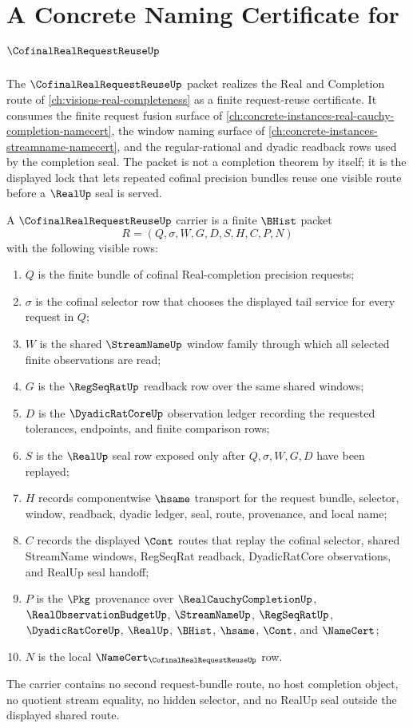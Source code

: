 \chapter{A Concrete Naming Certificate for $\CofinalRealRequestReuseUp$}
\label{ch:concrete-instances-cofinalrealrequestreuse-namecert}

The $\CofinalRealRequestReuseUp$ packet realizes the Real and Completion route of \autoref{ch:visions-real-completeness} as a finite request-reuse certificate. It consumes the finite request fusion surface of \autoref{ch:concrete-instances-real-cauchy-completion-namecert}, the window naming surface of \autoref{ch:concrete-instances-streamname-namecert}, and the regular-rational and dyadic readback rows used by the completion seal. The packet is not a completion theorem by itself; it is the displayed lock that lets repeated cofinal precision bundles reuse one visible route before a $\RealUp$ seal is served.

\begin{definition}
\label{def:cofinal-real-request-reuse-carrier}
A $\CofinalRealRequestReuseUp$ carrier is a finite $\BHist$ packet
$$
R=(Q,\sigma,W,G,D,S,H,C,P,N)
$$
with the following visible rows:
\begin{enumerate}
\item $Q$ is the finite bundle of cofinal Real-completion precision requests;
\item $\sigma$ is the cofinal selector row that chooses the displayed tail service for every request in $Q$;
\item $W$ is the shared $\StreamNameUp$ window family through which all selected finite observations are read;
\item $G$ is the $\RegSeqRatUp$ readback row over the same shared windows;
\item $D$ is the $\DyadicRatCoreUp$ observation ledger recording the requested tolerances, endpoints, and finite comparison rows;
\item $S$ is the $\RealUp$ seal row exposed only after $Q,\sigma,W,G,D$ have been replayed;
\item $H$ records componentwise $\hsame$ transport for the request bundle, selector, window, readback, dyadic ledger, seal, route, provenance, and local name;
\item $C$ records the displayed $\Cont$ routes that replay the cofinal selector, shared StreamName windows, RegSeqRat readback, DyadicRatCore observations, and RealUp seal handoff;
\item $P$ is the $\Pkg$ provenance over $\RealCauchyCompletionUp$, $\RealObservationBudgetUp$, $\StreamNameUp$, $\RegSeqRatUp$, $\DyadicRatCoreUp$, $\RealUp$, $\BHist$, $\hsame$, $\Cont$, and $\NameCert$;
\item $N$ is the local $\NameCert_{\CofinalRealRequestReuseUp}$ row.
\end{enumerate}
The carrier contains no second request-bundle route, no host completion object, no quotient stream equality, no hidden selector, and no RealUp seal outside the displayed shared route.
\end{definition}

